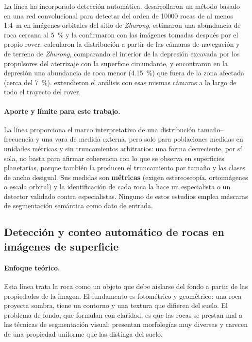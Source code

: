 La línea ha incorporado detección automática. \citet{chen2022zhurong} desarrollaron un método
basado en una red convolucional para detectar del orden de \num{10000} rocas de al menos
\SI{1.4}{\metre} en imágenes orbitales del sitio de \textit{Zhurong}, estimaron una abundancia
de roca cercana al \SI{5}{\percent} y la confirmaron con las imágenes tomadas después por el
propio rover. \citet{sun2024zhurong} calcularon la distribución a partir de las cámaras de
navegación y de terreno de \textit{Zhurong}, comparando el interior de la depresión excavada
por los propulsores del aterrizaje con la superficie circundante, y encontraron en la
depresión una abundancia de roca menor (\SI{4.15}{\percent}) que fuera de la zona afectada
(cerca del \SI{7}{\percent}). \citet{wang2024zhurong} extendieron el análisis con esas mismas
cámaras a lo largo de todo el trayecto del rover.

\paragraph{Aporte y límite para este trabajo.} La línea proporciona el marco interpretativo de
una distribución tamaño--frecuencia y una vara de medida externa, pero solo para poblaciones
medidas en unidades métricas y sin truncamientos arbitrarios: una forma decreciente, por sí
sola, no basta para afirmar coherencia con lo que se observa en superficies planetarias, porque
también la producen el truncamiento por tamaño y las clases de ancho desigual. Sus medidas son
\textbf{métricas} (exigen estereoscopía, ortoimágenes o
escala orbital) y la identificación de cada roca la hace un especialista o un detector
validado contra especialistas. Ninguno de estos estudios emplea máscaras de segmentación
semántica como dato de entrada.

\subsection{Detección y conteo automático de rocas en imágenes de superficie}
\label{sec:rev-deteccion}

\paragraph{Enfoque teórico.} Esta línea trata la roca como un objeto que debe aislarse del
fondo a partir de las propiedades de la imagen. El fundamento es fotométrico y geométrico:
una roca proyecta sombra, tiene un contorno y una textura que difieren del suelo. El problema
de fondo, que \citet{dunlop2007multiscale} formulan con claridad, es que las rocas se prestan
mal a las técnicas de segmentación visual: presentan morfologías muy diversas y carecen de una
propiedad uniforme que las distinga del suelo.

